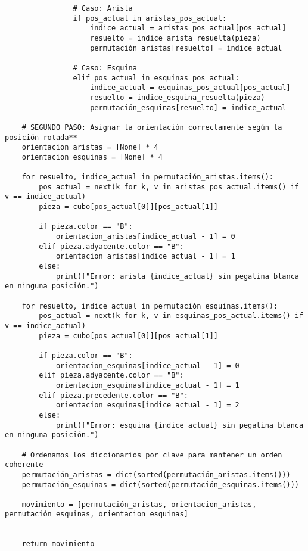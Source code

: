 \begin{lstlisting}
                # Caso: Arista
                if pos_actual in aristas_pos_actual:
                    indice_actual = aristas_pos_actual[pos_actual]
                    resuelto = indice_arista_resuelta(pieza)
                    permutación_aristas[resuelto] = indice_actual
                
                # Caso: Esquina
                elif pos_actual in esquinas_pos_actual:
                    indice_actual = esquinas_pos_actual[pos_actual]
                    resuelto = indice_esquina_resuelta(pieza)
                    permutación_esquinas[resuelto] = indice_actual
    
    # SEGUNDO PASO: Asignar la orientación correctamente según la posición rotada**
    orientacion_aristas = [None] * 4
    orientacion_esquinas = [None] * 4

    for resuelto, indice_actual in permutación_aristas.items():
        pos_actual = next(k for k, v in aristas_pos_actual.items() if v == indice_actual)
        pieza = cubo[pos_actual[0]][pos_actual[1]]
        
        if pieza.color == "B":
            orientacion_aristas[indice_actual - 1] = 0
        elif pieza.adyacente.color == "B":
            orientacion_aristas[indice_actual - 1] = 1
        else:
            print(f"Error: arista {indice_actual} sin pegatina blanca en ninguna posición.")

    for resuelto, indice_actual in permutación_esquinas.items():
        pos_actual = next(k for k, v in esquinas_pos_actual.items() if v == indice_actual)
        pieza = cubo[pos_actual[0]][pos_actual[1]]
        
        if pieza.color == "B":
            orientacion_esquinas[indice_actual - 1] = 0
        elif pieza.adyacente.color == "B":
            orientacion_esquinas[indice_actual - 1] = 1
        elif pieza.precedente.color == "B":
            orientacion_esquinas[indice_actual - 1] = 2
        else:
            print(f"Error: esquina {indice_actual} sin pegatina blanca en ninguna posición.")

    # Ordenamos los diccionarios por clave para mantener un orden coherente
    permutación_aristas = dict(sorted(permutación_aristas.items()))
    permutación_esquinas = dict(sorted(permutación_esquinas.items()))
    
    movimiento = [permutación_aristas, orientacion_aristas, permutación_esquinas, orientacion_esquinas]
    
    
    return movimiento


\end{lstlisting}
